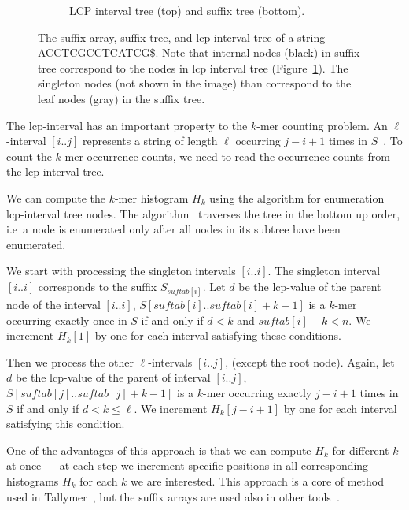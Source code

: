\begin{figure}[htp]
\begin{subfigure}[m]{0.47\textwidth}
   \caption{LCP interval tree (top) and suffix tree (bottom).}\label{fig:enhancedsuffixarraytree}
\end{subfigure}
\caption[The suffix array, suffix tree, and lcp interval tree]{The suffix array, suffix tree, and lcp interval tree of a string ACCTCGCCTCATCG\$. Note that internal nodes (black) in suffix tree correspond to the nodes in lcp interval tree (Figure~\ref{fig:enhancedsuffixarraytree}). The singleton nodes (not shown in the image) than correspond to the leaf nodes (gray) in the suffix tree.}\label{fig:enhancedsuffixarray}
\end{figure}
The lcp-interval has an important property to the $k$-mer counting problem. An $\ell$-interval $[i..j]$ represents a string of length $\ell$ occurring $j - i + 1$ times in $S$~\cite{tallymer}. To count the $k$-mer occurrence counts, we need to read the occurrence counts from the lcp-interval tree.

We can compute the $k$-mer histogram $H_k$ using the algorithm for enumeration lcp-interval tree nodes. The algorithm~\cite{enhancedsuffixarrays} traverses the tree in the bottom up order, i.e\ a node is enumerated only after all nodes in its subtree have been enumerated.

We start with processing the singleton intervals $[i..i]$. The singleton interval $[i..i]$ corresponds to the suffix $S_{suftab[i]}$. Let $d$ be the lcp-value of the parent node of the interval $[i..i]$, $S[suftab[i]..suftab[i]+k-1]$ is a $k$-mer occurring exactly once in $S$ if and only if $d < k$ and $suftab[i]+k < n$. We increment $H_k[1]$ by one for each interval satisfying these conditions.

Then we process the other $\ell$-intervals $[i..j]$, (except the root node). Again, let $d$ be the lcp-value of the parent of interval $[i..j]$, $S[suftab[j]..suftab[j] + k - 1]$ is a $k$-mer occurring exactly $j - i + 1$ times in $S$ if and only if $d < k \leq \ell$. We increment $H_k[j-i+1]$ by one for each interval satisfying this condition.

One of the advantages of this approach is that we can compute $H_k$ for different $k$ at once --- at each step we increment specific positions in all corresponding histograms $H_k$ for each $k$ we are interested. This approach is a core of method used in Tallymer~\cite{tallymer}, but the suffix arrays are used also in other tools~\cite{jellyfish}.

